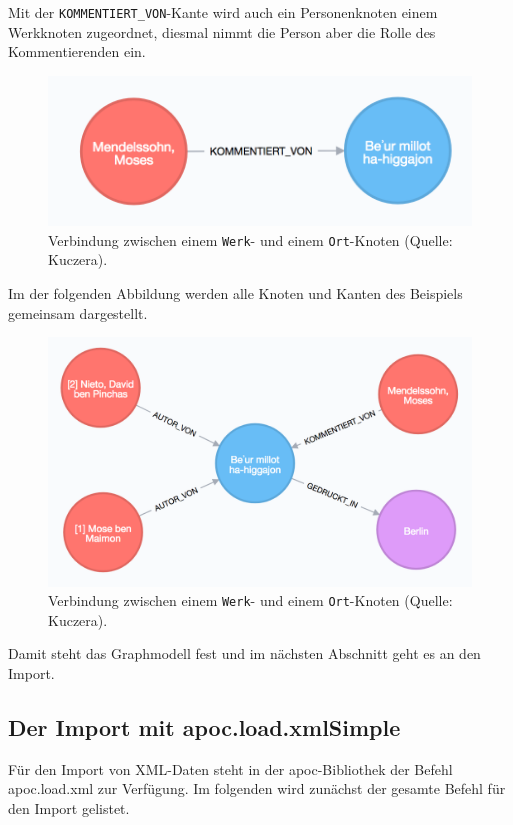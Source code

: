 \documentclass[12pt,ngerman,]{article}
\begin{document}
Mit der \texttt{KOMMENTIERT\_VON}-Kante wird auch ein Personenknoten
einem Werkknoten zugeordnet, diesmal nimmt die Person aber die Rolle des
Kommentierenden ein.

\begin{figure}
\centering
\includegraphics{Bilder/Werk-Kommentator.png}
\caption{Verbindung zwischen einem \texttt{Werk}- und einem
\texttt{Ort}-Knoten (Quelle: Kuczera).}
\end{figure}

Im der folgenden Abbildung werden alle Knoten und Kanten des Beispiels
gemeinsam dargestellt.

\begin{figure}
\centering
\includegraphics{Bilder/Werk-gesamt.png}
\caption{Verbindung zwischen einem \texttt{Werk}- und einem
\texttt{Ort}-Knoten (Quelle: Kuczera).}
\end{figure}

Damit steht das Graphmodell fest und im nächsten Abschnitt geht es an
den Import.

\subsection{Der Import mit
apoc.load.xmlSimple}\label{der-import-mit-apoc.load.xmlsimple}

Für den Import von XML-Daten steht in der apoc-Bibliothek der Befehl
apoc.load.xml zur Verfügung. Im folgenden wird zunächst der gesamte
Befehl für den Import gelistet.
\end{document}
